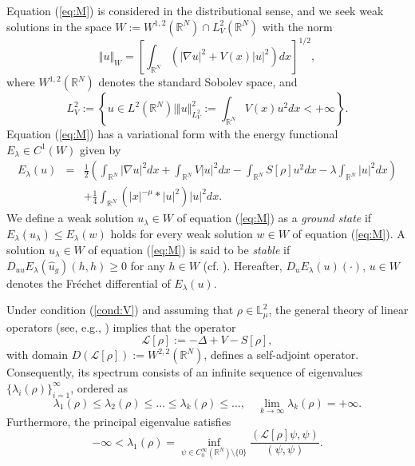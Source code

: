 \documentclass[12pt,thmsa]{article}
\begin{document}
Equation (\ref{eq:M}) is considered in the distributional sense, and we seek
weak solutions in the space $W:=W^{1,2}(\mathbb{R}^{N})\cap L_{V}^{2}(%
\mathbb{R}^{N})$ with the norm
\begin{equation*}
\Vert u\Vert _{W}=\left[ \int_{\mathbb{R}^{N}}(|\nabla u|^{2}+V(x)|u|^{2})dx%
\right] ^{1/2},
\end{equation*}%
where $W^{1,2}(\mathbb{R}^{N})$ denotes the standard Sobolev space, and
\begin{equation*}
L_{V}^{2}:=\left\{ u\in L^{2}(\mathbb{R}^{N})\mid \Vert u\Vert
_{L_{V}^{2}}^{2}:=\int_{\mathbb{R}^{N}}V(x)u^{2}dx<+\infty \right\} .
\end{equation*}%
Equation (\ref{eq:M}) has a variational form with the energy functional $%
E_{\lambda }\in C^{1}(W)$ given by
\begin{eqnarray*}
E_{\lambda }(u) &=&\frac{1}{2}\left( \int_{\mathbb{R}^{N}}|\nabla
u|^{2}dx+\int_{\mathbb{R}^{N}}V|u|^{2}dx-\int_{\mathbb{R}^{N}}S[\rho
]u^{2}dx-\lambda \int_{\mathbb{R}^{N}}|u|^{2}dx\right) \\
&&+\frac{1}{4}\int_{\mathbb{R}^{N}}\left( |x|^{-\mu }\ast |u|^{2}\right)
|u|^{2}dx.
\end{eqnarray*}%
We define a weak solution $u_{\lambda }\in W$ of equation (\ref{eq:M}) as a
\textit{ground state} if $E_{\lambda }(u_{\lambda })\leq E_{\lambda }(w)$
holds for every weak solution $w\in W$ of equation (\ref{eq:M}). A solution $%
u_{\lambda }\in W$ of equation (\ref{eq:M}) is said to be \textit{stable} if
$D_{uu}E_{\lambda }(\hat{u}_{g})(h,h)\geq 0$ for any $h\in W$ (cf. \cite%
{Dupaigne}). Hereafter, $D_{u}E_{\lambda }(u)(\cdot )$, $u\in W$ denotes the
Fr\'{e}chet differential of $E_{\lambda }(u)$.

Under condition (\ref{cond:V}) and assuming that $\rho \in \mathbb{L}_{\mu
}^{2}$, the general theory of linear operators (see, e.g., \cite{Kato,
SimonReed}) implies that the operator
\begin{equation*}
\mathcal{L}[\rho ]:=-\Delta +V-S[\rho ],
\end{equation*}%
with domain $D(\mathcal{L}[\rho ]):=W^{2,2}(\mathbb{R}^{N})$, defines a
self-adjoint operator. Consequently, its spectrum consists of an infinite
sequence of eigenvalues $\{\lambda _{i}(\rho )\}_{i=1}^{\infty }$, ordered
as
\begin{equation*}
\lambda _{1}(\rho )\leq \lambda _{2}(\rho )\leq \dots \leq \lambda _{k}(\rho
)\leq \dots ,\quad \lim_{k\rightarrow \infty }\lambda _{k}(\rho )=+\infty .
\end{equation*}%
Furthermore, the principal eigenvalue satisfies
\begin{equation}
-\infty <\lambda _{1}(\rho )=\inf_{\psi \in C_{0}^{\infty }(\mathbb{R}%
^{N})\setminus \{0\}}\frac{(\mathcal{L}[\rho ]\psi ,\psi )}{(\psi ,\psi )}.
\label{eq:lambda1}
\end{equation}
\end{document}
